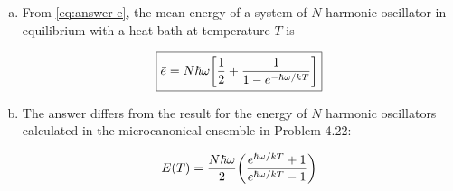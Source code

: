 \documentclass[11pt,a4paper,twocolumn]{article}
\begin{document}
\begin{enumerate}[(a)]
\item From \eqref{eq:answer-e}, the mean energy of a system of $N$ harmonic oscillator in equilibrium with a heat bath at temperature $T$ is

\begin{equation}
	\boxed{
		\bar{e} = N\hbar\omega\qty[\frac{1}{2} + \frac{1}{1 - e^{-\hbar\omega/kT}}]
	} \label{eq:answer-b}
\end{equation}

\item The answer differs from the result for the energy of $N$ harmonic oscillators calculated in the microcanonical ensemble in Problem 4.22:

\begin{equation}
	E(T) = \frac{N\hbar\omega}{2}\qty(\frac{e^{\hbar\omega/kT} + 1}{e^{\hbar\omega/kT} - 1}) \label{eq:answer-c}
\end{equation}

\end{enumerate}
\end{document}
